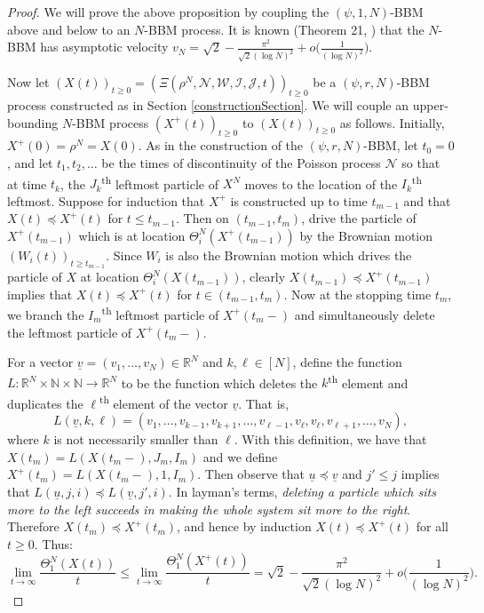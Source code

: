\documentclass{article}
\newcommand{\B}[1]{\mathbb{#1}}
\newcommand{\C}[1]{\mathcal{#1}}
\newcommand{\oop}{\preccurlyeq}
\begin{document}
\begin{proof}
    We will prove the above proposition by coupling the $(\psi,1,N)$-BBM above and below to an $N$-BBM process. It is known (Theorem 21, \cite{me1}) that the $N$-BBM has asymptotic velocity $v_N = \sqrt{2}-\frac{\pi^2}{\sqrt{2}(\log N)^2} + o\Big(\frac{1}{(\log N)^2}\Big)$.

    Now let $(X(t))_{t\geq 0}=(\Xi(\rho^N,\C{N},\C{W},\C{I},\C{J},t))_{t\geq 0}$ be a $(\psi,r,N)$-BBM process constructed as in Section \ref{constructionSection}. We will couple an upper-bounding $N$-BBM process $(X^+(t))_{t\geq 0}$ to $(X(t))_{t\geq 0}$ as follows. Initially, $X^+(0)=\rho^N=X(0)$. As in the construction of the $(\psi,r,N)$-BBM, let $t_0=0$, and let $t_1,t_2,\ldots$ be the times of discontinuity of the Poisson process $\C{N}$ so that at time $t_k$, the $J_k$\textsuperscript{th} leftmost particle of $X^N$ moves to the location of the $I_k$\textsuperscript{th} leftmost. Suppose for induction that $X^+$ is constructed up to time $t_{m-1}$ and that $X(t)\oop X^+(t)$ for $t\leq t_{m-1}$. Then on $(t_{m-1},t_m)$, drive the particle of $X^+(t_{m-1})$ which is at location $\Theta^N_i(X^+(t_{m-1}))$ by the Brownian motion $(W_i(t))_{t\geq t_{m-1}}$. Since $W_i$ is also the Brownian motion which drives the particle of $X$ at location $\Theta^N_i(X(t_{m-1}))$, clearly $X(t_{m-1})\oop X^+(t_{m-1})$ implies that $X(t)\oop X^+(t)$ for $t\in (t_{m-1},t_m)$. Now at the stopping time $t_m$, we branch the $I_m$\textsuperscript{th} leftmost particle of $X^+(t_m-)$ and simultaneously delete the leftmost particle of $X^+(t_m-)$. 

    For a vector $\underline{v}=(v_1,\ldots,v_N)\in \B{R}^N$ and $k,\ell\in [N]$, define the function $L:\B{R}^N\times \B{N}\times \B{N}\to\B{R}^N$ to be the function which deletes the $k$\textsuperscript{th} element and duplicates the $\ell$\textsuperscript{th} element of the vector $\underline{v}$. That is, $$L(\underline{v},k,\ell)=(v_1,\ldots,v_{k-1},v_{k+1},\ldots,v_{\ell-1},v_{\ell},v_{\ell},v_{\ell+1},\ldots,v_N),$$
    where $k$ is not necessarily smaller than $\ell$. With this definition, we have that $X(t_m)=L(X(t_m-),J_m,I_m)$ and we define $X^+(t_m)=L(X(t_m-),1,I_m)$. Then observe that $\underline{u}\oop \underline{v}$ and $j'\leq j$ implies that $L(\underline{u},j,i)\oop L(\underline{v},j',i)$. In layman's terms, \textit{deleting a particle which sits more to the left succeeds in making the whole system sit more to the right}. Therefore $X(t_m)\oop X^+(t_m)$, and hence by induction $X(t)\oop X^+(t)$ for all $t\geq 0$. Thus:
    $$\lim_{t\to\infty}\frac{\Theta^N_1(X(t))}{t} \leq \lim_{t\to\infty}\frac{\Theta^N_1(X^+(t))}{t}=\sqrt{2}-\frac{\pi^2}{\sqrt{2}(\log N)^2} + o\Big(\frac{1}{(\log N)^2}\Big).$$


\end{proof}
\end{document}
